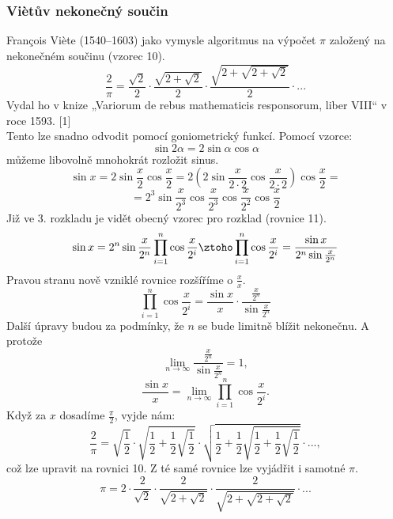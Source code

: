 \documentclass[rocnikovka]{gzwroc} %
\begin{document}
\subsubsection{Viètův nekonečný součin}
François Viète (1540–1603) jako  vymysle algoritmus na výpočet $\pi$ založený na nekonečném součinu (vzorec 10).
\begin{equation}
\frac{2}{\pi}=\frac{\sqrt{2}}{2}\cdot\frac{\sqrt{2+\sqrt{2}}}{2}\cdot\frac{\sqrt{2+\sqrt{2+\sqrt{2}}}}{2}\cdot ...
\end{equation}
Vydal ho v knize „Variorum de rebus mathematicis responsorum, liber VIII“ v roce 1593. [1]\\
Tento lze snadno odvodit pomocí goniometrický funkcí. Pomocí vzorce:
$$
\sin 2\alpha = 2\sin \alpha \cos \alpha
$$
můžeme libovolně mnohokrát rozložit sinus.
$$
\sin x = 2\sin \frac{x}{2} \cos \frac{x}{2} = 2\left( 2\sin \frac{x}{2\cdot 2} \cos \frac{x}{2\cdot 2}\right) \cos \frac{x}{2} =
$$
\begin{equation}
= 2^3 \sin \frac{x}{2^3} \cos \frac{x}{2^3} \cos \frac{x}{2^2} \cos \frac{x}{2}
\end{equation}
Již ve 3. rozkladu je vidět obecný vzorec pro rozklad (rovnice 11).
\begin{equation}
\sin x =2^n \sin \frac{x}{2^n}\prod_{i=1}^{n} \cos \frac{x}{2^i} \ztoho \prod_{i=1}^{n} \cos \frac{x}{2^i} = \frac{\sin x}{2^n \sin \frac{x}{2^n}}
\end{equation}
Pravou stranu nově vzniklé rovnice rozšíříme o $\frac{x}{x}$.
\begin{equation}
\prod_{i=1}^{n} \cos \frac{x}{2^i} = \frac{\sin x}{x} \cdot  \frac{\frac{x}{2^n}}{\sin \frac{x}{2^n}}
\end{equation}
Další úpravy budou za podmínky, že $n$ se bude limitně blížit nekonečnu. A protože
$$
\lim_{n\to\infty} \frac{\frac{x}{2^n}}{\sin \frac{x}{2^n}} = 1,
$$
\begin{equation}
\frac{\sin x}{x} = \lim_{n\to\infty} \prod_{i=1}^{n} \cos \frac{x}{2^i}.
\end{equation}
Když za $x$ dosadíme $\frac{\pi}{2}$, vyjde nám:
\begin{equation}
\frac{2}{\pi}=\sqrt{\frac{1}{2}}\cdot\sqrt{\frac{1}{2}+\frac{1}{2}\sqrt{\frac{1}{2}}}\cdot\sqrt{\frac{1}{2}+\frac{1}{2}\sqrt{\frac{1}{2}+\frac{1}{2}\sqrt{\frac{1}{2}}}}\cdot ...,
\end{equation}
což lze upravit na rovnici 10. Z té samé rovnice lze vyjádřit i samotné $\pi$.
$$
\pi=2\cdot\frac{2}{\sqrt{2}}\cdot\frac{2}{\sqrt{2+\sqrt{2}}}\cdot\frac{2}{\sqrt{2+\sqrt{2+\sqrt{2}}}}\cdot ...
$$
\end{document}
